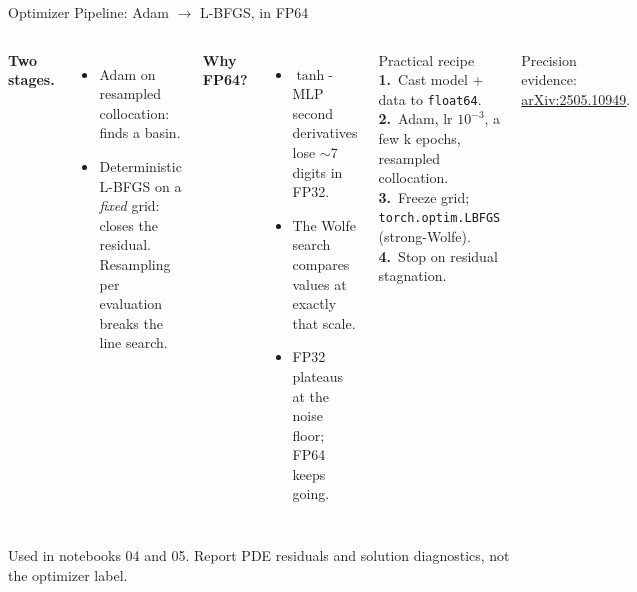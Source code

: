 \documentclass[aspectratio=169,11pt]{beamer}
\newcommand{\emphc}[1]{\textcolor{harvardcrimson}{#1}}
\begin{document}
\begin{frame}{Optimizer Pipeline: Adam $\to$ L-BFGS, in FP64}
\small
\begin{columns}[T]
\textbf{Two stages.}
\begin{itemize}\itemsep0pt
    \item \emphc{Adam} on resampled collocation: finds a basin.
    \item \emphc{Deterministic L-BFGS} on a \emph{fixed} grid: closes the residual. Resampling per evaluation breaks the line search.
\end{itemize}

\vspace{0.3em}
\textbf{Why FP64?}
\begin{itemize}\itemsep0pt
    \item $\tanh$-MLP second derivatives lose $\sim$7 digits in FP32.
    \item The Wolfe search compares values at exactly that scale.
    \item FP32 plateaus at the noise floor; FP64 keeps going.
\end{itemize}

\begin{block}{Practical recipe}
\footnotesize
\textbf{1.}~Cast model + data to \texttt{float64}.\\
\textbf{2.}~Adam, lr $10^{-3}$, a few k epochs, resampled collocation.\\
\textbf{3.}~Freeze grid; \texttt{torch.optim.LBFGS} (strong-Wolfe).\\
\textbf{4.}~Stop on residual stagnation.
\end{block}
{\footnotesize Precision evidence: \href{https://arxiv.org/abs/2505.10949}{arXiv:2505.10949}.}
\end{columns}

\vspace{0.2em}
{\footnotesize \emphc{Used in notebooks 04 and 05.} Report PDE residuals and solution diagnostics, not the optimizer label.}
\end{frame}
\end{document}
